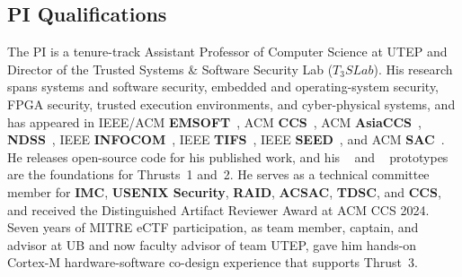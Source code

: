 \subsection{PI Qualifications}
The PI is a tenure-track Assistant Professor of Computer Science at UTEP and Director of the Trusted Systems \& Software Security Lab ($T_3SLab$).
His research spans systems and software security, embedded and operating-system security, FPGA security, trusted execution environments, and cyber-physical systems, and has appeared in IEEE/ACM \textbf{EMSOFT}~\cite{armanuzzaman2026enola}, ACM \textbf{CCS}~\cite{ma2026wejust,ma2025ectf}, ACM \textbf{AsiaCCS}~\cite{byotee24}, \textbf{NDSS}~\cite{shang2025mia}, IEEE \textbf{INFOCOM}~\cite{guan2025TLS}, IEEE \textbf{TIFS}~\cite{Rui2025QFL}, IEEE \textbf{SEED}~\cite{zhao24tee}, and ACM \textbf{SAC}~\cite{tan24canary}.
He releases open-source code for his published work, and his \byotee~\cite{armanuzzaman2024building} and \enola~\cite{armanuzzaman2026enola} prototypes are the foundations for Thrusts~1 and~2.
He serves as a technical committee member for \textbf{IMC}, \textbf{USENIX Security}, \textbf{RAID}, \textbf{ACSAC}, \textbf{TDSC}, and \textbf{CCS}, and received the Distinguished Artifact Reviewer Award at ACM CCS 2024.
Seven years of MITRE eCTF participation, as team member, captain, and advisor at UB and now faculty advisor of team UTEP, gave him hands-on Cortex-M hardware-software co-design experience that supports Thrust~3.